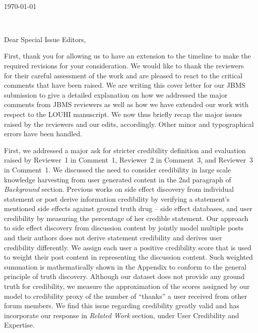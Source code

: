 \documentclass[11pt,a4paper]{letter} %
\def\opening#1{\thispagestyle{empty}
{\centering\fromaddress \vspace{0.6in} \\ %
\hspace*{\longindentation}\today\hspace*{\fill}\par} %
{\raggedright \toname \\ \toaddress \par} %
\vspace{0.4in} %
\noindent #1 %
}
\begin{document}

\begin{letter}
{}
\small
\opening{Dear Special Issue Editors,}

First, thank you for allowing us to have an extension to the timeline to make the required revisions for your consideration.  We would like to thank the reviewers for their careful assessment of the work and are pleased to react to the critical comments that have been raised.  We are writing this cover letter for our JBMS submission to give a detailed explanation on how we addressed the major comments from JBMS reviewers as well as how we have extended our work with respect to the LOUHI manuscript. We now thus briefly recap the major issues raised by the reviewers and our edits, accordingly. Other minor and typographical errors have been handled.

First, we addressed a major ask for stricter credibility definition and evaluation raised by Reviewer~1 in Comment~1, Reviewer~2 in Comment~3, and Reviewer~3 in Comment~1. We discussed the need to consider credibility in large scale knowledge harvesting from user generated content in the 2nd paragraph of {\it Background} section. Previous works on side effect discovery from individual statement or post derive information credibility by verifying a statement's mentioned side effects against ground truth drug -- side effect databases, and user credibility by measuring the percentage of her credible statement. Our approach to side effect discovery from discussion content by jointly model multiple posts and their authors does not derive statement credibility and derives user credibility differently. We assign each user a positive credibility score that is used to weight their post content in representing the discussion content. Such weighted summation is mathematically shown in the Appendix to conform to the general principle of truth discovery. Although our dataset does not provide any ground truth for credibility, we measure the approximation of the scores assigned by our model to credibility proxy of the number of ``thanks'' a user received from other forum members. We find this issue regarding credibility greatly valid and has incorporate our response in {\it Related Work} section, under User Credibility and Expertise.


\end{letter}
\end{document}
